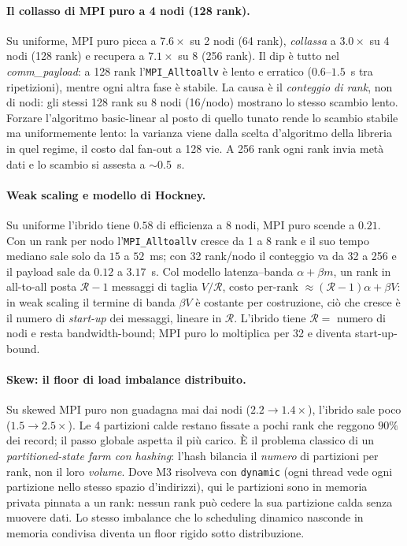 \documentclass[11pt,a4paper]{article}
\theoremstyle{remark}
\begin{document}
\paragraph{Il collasso di MPI puro a 4 nodi (128 rank).} Su uniforme, MPI puro picca a $7.6\times$ su 2 nodi (64 rank), \emph{collassa} a $3.0\times$ su 4 nodi (128 rank) e recupera a $7.1\times$ su 8 (256 rank). Il dip \`e tutto nel \emph{comm\_payload}: a 128 rank l'\texttt{MPI\_Alltoallv} \`e lento e erratico ($0.6$--$1.5$~s tra ripetizioni), mentre ogni altra fase \`e stabile. La causa \`e il \emph{conteggio di rank}, non di nodi: gli stessi 128 rank su 8 nodi (16/nodo) mostrano lo stesso scambio lento. Forzare l'algoritmo basic-linear al posto di quello tunato rende lo scambio stabile ma uniformemente lento: la varianza viene dalla scelta d'algoritmo della libreria in quel regime, il costo dal fan-out a 128 vie. A 256 rank ogni rank invia met\`a dati e lo scambio si assesta a $\sim$0.5~s.

\paragraph{Weak scaling e modello di Hockney.} Su uniforme l'ibrido tiene $0.58$ di efficienza a 8 nodi, MPI puro scende a $0.21$. Con un rank per nodo l'\texttt{MPI\_Alltoallv} cresce da 1 a 8 rank e il suo tempo mediano sale solo da $15$ a $52$~ms; con 32 rank/nodo il conteggio va da 32 a 256 e il payload sale da $0.12$ a $3.17$~s. Col modello latenza--banda $\alpha+\beta m$, un rank in all-to-all posta $\mathcal{R}-1$ messaggi di taglia $V/\mathcal{R}$, costo per-rank $\approx(\mathcal{R}-1)\alpha+\beta V$: in weak scaling il termine di banda $\beta V$ \`e costante per costruzione, ci\`o che cresce \`e il numero di \emph{start-up} dei messaggi, lineare in $\mathcal{R}$. L'ibrido tiene $\mathcal{R}=$ numero di nodi e resta bandwidth-bound; MPI puro lo moltiplica per 32 e diventa start-up-bound.

\paragraph{Skew: il floor di load imbalance distribuito.} Su skewed MPI puro non guadagna mai dai nodi ($2.2\to 1.4\times$), l'ibrido sale poco ($1.5\to 2.5\times$). Le 4 partizioni calde restano fissate a pochi rank che reggono $90\%$ dei record; il passo globale aspetta il pi\`u carico. \`E il problema classico di un \emph{partitioned-state farm con hashing}: l'hash bilancia il \emph{numero} di partizioni per rank, non il loro \emph{volume}. Dove M3 risolveva con \texttt{dynamic} (ogni thread vede ogni partizione nello stesso spazio d'indirizzi), qui le partizioni sono in memoria privata pinnata a un rank: nessun rank pu\`o cedere la sua partizione calda senza muovere dati. Lo stesso imbalance che lo scheduling dinamico nasconde in memoria condivisa diventa un floor rigido sotto distribuzione.
\end{document}

